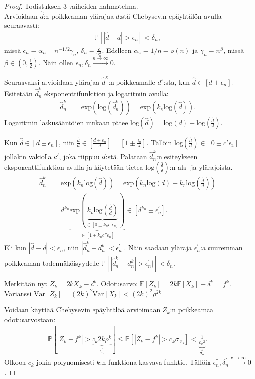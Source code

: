 \documentclass[finnish,12pt,a4paper,pdftex,sci,utf8]{aaltothesis}
\begin{document}
\begin{proof}
	Todistuksen 3 vaiheiden hahmotelma. \\
Arvioidaan $\hat{d}$:n poikkeaman ylärajaa $d$:stä Chebysevin epäyhtälön avulla seuraavasti:
\begin{align*}
	\mathbb{P}[|\hat{d} - d| > \epsilon_{n}^{}] < \delta_n,
\end{align*}
missä $\epsilon_{n}^{} = \alpha_n + n^{-1/2} \gamma_n$, $\delta_n = \frac{c}{\gamma_n^2}$. Edelleen $\alpha_n = 1/n = o(n)$ ja $\gamma_n = n^{\beta}$, missä $\beta \in (0,\frac{1}{2})$. Näin ollen $\epsilon_{n}^{}, \delta_n \xrightarrow{n \rightarrow \infty} 0$.

Seuraavaksi arvioidaan ylärajaa $\hat{d}^k$:n poikkeamalle $d^k$:sta, kun $\hat{d} \in [d \pm \epsilon_{n}^{}]$.
Esitetään $\hat{d}^k_n$ eksponenttifunkition ja logaritmin avulla:
\begin{align*}
	\hat{d}^k_n &= \text{exp}(\text{log}(\hat{d}^k_n)) = \text{exp}(k_n \text{log}(\hat{d})).
\end{align*}
Logaritmin laskusääntöjen mukaan pätee $\text{log}(\hat{d}) = \text{log}(d) + \text{log}(\frac{\hat{d}}{d})$.

Kun $\hat{d} \in [d \pm \epsilon_{n}^{}]$, niin $\frac{\hat{d}}{d} \in [\frac{d \pm \epsilon_{n}^{}}{d}] = [1 \pm \frac{\epsilon_{n}^{}}{d}]$. Tällöin $\text{log}(\frac{\hat{d}}{d}) \in [0 \pm c'\epsilon_{n}^{}]$ jollakin vakiolla $c'$, joka riippuu $d$:stä.
Palataan $\hat{d}^k_n$:n esiteykseen eksponenttifunktion avulla ja käytetään tietoa $\text{log}(\frac{\hat{d}}{d})$:n ala- ja ylärajoista.
\begin{align*}
	\hat{d}^k_n &= \text{exp}(k_n \text{log}(\hat{d})) = \text{exp}(k_n\text{log}(d) + k_n \text{log}(\frac{\hat{d}}{d})) \\
	&= d^{k_n} \underbrace{\text{exp}(\underbrace{k_n \text{log}(\frac{\hat{d}}{d})}_{\in [0 \pm k_n c' \epsilon_{n}^{}]})}_{\in [1 \pm k_n c'' \epsilon_{n}^{}]} \in [d^{k_n} \pm \epsilon_{n}^{'}].
\end{align*}
Eli  kun $|\hat{d} - d| < \epsilon_{n}^{}$, niin $|\hat{d}^k_n - d^k_n| < \epsilon_{n}^{'}|$. Näin saadaan yläraja $\epsilon_{n}^{'}$:a suuremman poikkeaman todennäköisyydelle $\mathbb{P}[|\hat{d}^k_n - d^k_n| > \epsilon_{n}^{'}|] < \delta_n$.

Merkitään nyt $Z_k = 2k X_k - d^k$. Odotusarvo: $\mathbb{E}[Z_k] = 2k \mathbb{E}[X_k] - d^k = f^k$. Varianssi $\text{Var}[Z_k] = (2k)^2\text{Var}[X_k] < (2k)^2 \rho^{2k}$.

Voidaan käyttää Chebysevin epäyhtälöä arvioimaan $Z_k$:n poikkeamaa odotusarvostaan:
\begin{align*}
	\mathbb{P}[|Z_k - f^k| > \underbrace{c_k 2k \rho^k}_{\epsilon_{n}^{''}}] \leq \mathbb{P}[|Z_k - f^k| > c_k \sigma_{Z_k}] < \underbrace{\frac{1}{{c_k}^2}}_{\delta_n^{'}}.
\end{align*}
Olkoon $c_k$ jokin polynomisesti $k$:n funktiona kasvava funktio. Tällöin $\epsilon_{n}^{''}, \delta_n^{'} \xrightarrow{ n \rightarrow \infty} 0$.


\end{proof}
\end{document}
